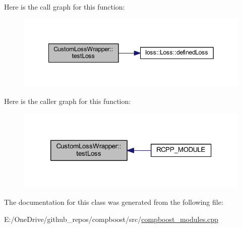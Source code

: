 Here is the call graph for this function\+:\nopagebreak
\begin{figure}[H]
\begin{center}
\leavevmode
\includegraphics[width=349pt]{class_custom_loss_wrapper_a6430fb3e6c2cfaea13e64645ab80d8b7_cgraph}
\end{center}
\end{figure}
Here is the caller graph for this function\+:\nopagebreak
\begin{figure}[H]
\begin{center}
\leavevmode
\includegraphics[width=320pt]{class_custom_loss_wrapper_a6430fb3e6c2cfaea13e64645ab80d8b7_icgraph}
\end{center}
\end{figure}


The documentation for this class was generated from the following file\+:\begin{DoxyCompactItemize}
\item 
E\+:/\+One\+Drive/github\+\_\+repos/compboost/src/\mbox{\hyperlink{compboost__modules_8cpp}{compboost\+\_\+modules.\+cpp}}\end{DoxyCompactItemize}

